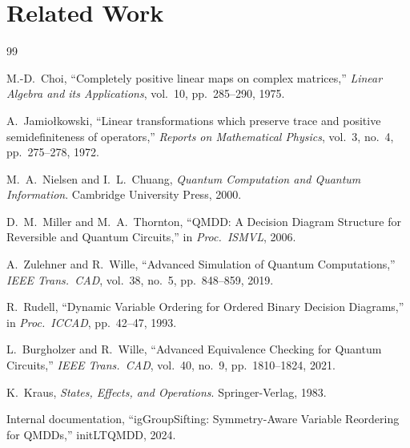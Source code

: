 \documentclass[11pt,a4paper]{article}
\begin{document}
\appendix
\section{Related Work}

\begin{thebibliography}{99}

M.-D.\ Choi,
``Completely positive linear maps on complex matrices,''
\emph{Linear Algebra and its Applications}, vol.~10, pp.~285--290, 1975.

A.\ Jamio{\l}kowski,
``Linear transformations which preserve trace and positive semidefiniteness of operators,''
\emph{Reports on Mathematical Physics}, vol.~3, no.~4, pp.~275--278, 1972.

M.~A.\ Nielsen and I.~L.\ Chuang,
\emph{Quantum Computation and Quantum Information}.
Cambridge University Press, 2000.

D.~M.\ Miller and M.~A.\ Thornton,
``QMDD: A Decision Diagram Structure for Reversible and Quantum Circuits,''
in \emph{Proc.\ ISMVL}, 2006.

A.\ Zulehner and R.\ Wille,
``Advanced Simulation of Quantum Computations,''
\emph{IEEE Trans.\ CAD}, vol.~38, no.~5, pp.~848--859, 2019.

R.\ Rudell,
``Dynamic Variable Ordering for Ordered Binary Decision Diagrams,''
in \emph{Proc.\ ICCAD}, pp.~42--47, 1993.

L.\ Burgholzer and R.\ Wille,
``Advanced Equivalence Checking for Quantum Circuits,''
\emph{IEEE Trans.\ CAD}, vol.~40, no.~9, pp.~1810--1824, 2021.

K.\ Kraus,
\emph{States, Effects, and Operations}.
Springer-Verlag, 1983.

Internal documentation,
``igGroupSifting: Symmetry-Aware Variable Reordering for QMDDs,''
initLTQMDD, 2024.

\end{thebibliography}
\end{document}
